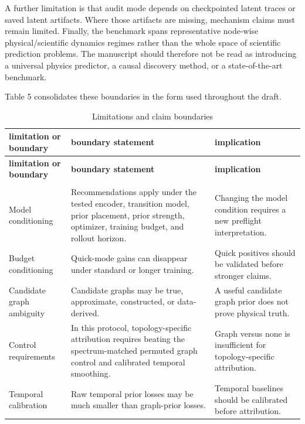 \documentclass[preprint,12pt]{elsarticle}
\begin{document}
A further limitation is that audit mode depends on checkpointed latent traces or saved latent artifacts. Where those artifacts are missing, mechanism claims must remain limited. Finally, the benchmark spans representative node-wise physical/scientific dynamics regimes rather than the whole space of scientific prediction problems. The manuscript should therefore not be read as introducing a universal physics predictor, a causal discovery method, or a state-of-the-art benchmark.

Table 5 consolidates these boundaries in the form used throughout the draft.

\begingroup
\footnotesize
\setlength{\tabcolsep}{4pt}
\begin{longtable}{>{\raggedright\arraybackslash}p{}>{\raggedright\arraybackslash}p{}>{\raggedright\arraybackslash}p{}}
\caption{Limitations and claim boundaries}\label{tab:limitations-boundaries}\\
\toprule
\textbf{limitation or boundary} & \textbf{boundary statement} & \textbf{implication} \\
\midrule
\endfirsthead
\toprule
\textbf{limitation or boundary} & \textbf{boundary statement} & \textbf{implication} \\
\midrule
\endhead
\midrule
\multicolumn{3}{r}{\emph{Continued on next page}} \\
\midrule
\endfoot
\bottomrule
\endlastfoot
Model conditioning & Recommendations apply under the tested encoder, transition model, prior placement, prior strength, optimizer, training budget, and rollout horizon. & Changing the model condition requires a new preflight interpretation. \\
Budget conditioning & Quick-mode gains can disappear under standard or longer training. & Quick positives should be validated before stronger claims. \\
Candidate graph ambiguity & Candidate graphs may be true, approximate, constructed, or data-derived. & A useful candidate graph prior does not prove physical truth. \\
Control requirements & In this protocol, topology-specific attribution requires beating the spectrum-matched permuted graph control and calibrated temporal smoothing. & Graph versus none is insufficient for topology-specific attribution. \\
Temporal calibration & Raw temporal prior losses may be much smaller than graph-prior losses. & Temporal baselines should be calibrated before attribution. \\

\end{longtable}
\end{document}
